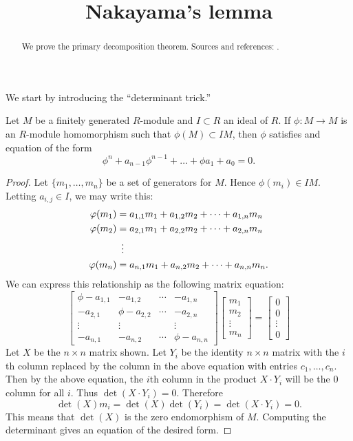 \documentclass{ximera}
\title{Nakayama's lemma}
\begin{document}
\begin{abstract}
  We prove the primary decomposition theorem. Sources and references:
  \cite{AM1969,jpS2000}.
\end{abstract}
\maketitle

We start by introducing the ``determinant trick.''

\begin{proposition}
  Let $M$ be a finitely generated $R$-module and $I\subset R$ an ideal
  of $R$. If $\phi:M\to M$ is an $R$-module homomorphism such that
  $\phi(M)\subset I M$, then $\phi$ satisfies and equation of the form
  \[
  \phi^n + a_{n-1}\phi^{n-1} + \dots + \phi a_1 + a_0 = 0.
  \]
  \begin{proof}
    Let $\{m_1,\dots, m_n\}$ be a set of generators for $M$. Hence $\phi(m_i) \in I M$. Letting $a_{i,j}\in I$, we may write this:
    \begin{align*}
      \phi(m_1) &= a_{1,1}m_1 + a_{1,2}m_2 + \dots + a_{1,n}m_n\\
      \phi(m_2) &= a_{2,1}m_1 + a_{2,2}m_2 + \dots + a_{2,n}m_n\\
      &\hspace{.5em}  \vdots \\
      \phi(m_n) &= a_{n,1}m_1 + a_{n,2}m_2 + \dots + a_{n,n}m_n. 
    \end{align*}
    We can express this relationship as the following matrix equation:
    \[
    \begin{bmatrix}
      \phi - a_{1,1} & - a_{1,2} & \cdots & - a_{1,n}\\
      - a_{2,1} & \phi - a_{2,2} & \cdots & - a_{2,n}\\
      \vdots & \vdots & & \vdots \\
      -a_{n,1} & -a_{n,2} & \cdots & \phi - a_{n,n}
    \end{bmatrix}
    \begin{bmatrix}
      m_1\\
      m_2\\
      \vdots \\
      m_n
    \end{bmatrix}
    =
    \begin{bmatrix}
      0\\
      0\\
      \vdots\\
      0
    \end{bmatrix}
    \]
    Let $X$ be the $n \times n$ matrix shown.  Let $Y_i$ be the
    identity $n \times n$ matrix with the $i$th column replaced by the
    column in the above equation with entries $c_1,\ldots,c_n$.  Then
    by the above equation, the $i$th column in the product $X\cdot
    Y_i$ will be the $0$ column for all $i$.  Thus $\det(X\cdot Y_i)
    =0$.  Therefore
    \[
    \det(X) m_i = \det(X) \det(Y_i) = \det(X \cdot Y_i) = 0.
    \]
    This means that $\det(X)$ is the zero endomorphism of
    $M$. Computing the determinant gives an equation of the desired
    form.
  \end{proof}
\end{proposition}

\begin{corollary}
\end{corollary}

\begin{corollary}
\end{corollary}
\end{document}
